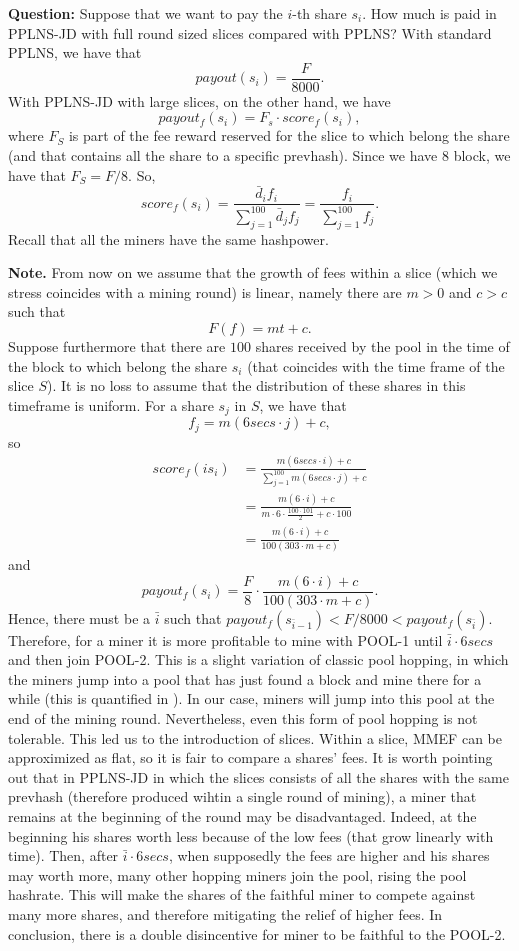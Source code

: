 \documentclass[11pt]{article}
\begin{document}
\textbf{Question:} Suppose that we want to pay the $i$-th share $s_i$. How much is paid in PPLNS-JD with full round sized slices compared with PPLNS?
With standard PPLNS, we have that
\[payout(s_i) = \frac{F}{8000}.\]
With PPLNS-JD with large slices, on the other hand, we have
\[payout_f(s_i) = F_s\cdot score_f(s_i),\]
where $F_S$ is part of the fee reward reserved for the slice to which belong the share (and that contains all the share to a specific prevhash). Since we have $8$ block, we have that $F_S = F/8$. So,
\[score_f(s_i) = \frac{\bar d_i f_i}{\sum_{j=1}^{100} \bar d_j f_j}= \frac{ f_i}{\sum_{j=1}^{100} f_j}. \]
Recall that all the miners have the same hashpower.

\textbf{Note.} From now on we assume that the growth of fees within a slice (which we stress coincides with a mining round) is linear, namely there are $m>0$ and $c>c$ such that
\[F(f) = mt+c.\]
Suppose furthermore that there are $100$ shares received by the pool in the time of the block to which belong the share $s_i$ (that coincides with the time frame of the slice $S$). It is no loss to assume that the distribution of these shares in this timeframe is uniform. For a share $s_j$ in $S$, we have that
\[ f_j = m(6secs \cdot j) +c,\]
so
\begin{align*}
	score_f(is_i) & = \frac{m(6secs\cdot i) +c}{\sum_{j=1}^{100} m(6secs\cdot j) +c}        \\
	              & = \frac{m(6\cdot i) +c}{m\cdot 6\cdot\frac{100\cdot101}{2} +c\cdot 100} \\
	              & = \frac{m(6\cdot i) +c}{100(303\cdot m +c)}
\end{align*}
and
\[payout_f(s_i) = \frac{F}{8} \cdot \frac{m(6\cdot i) +c}{100(303\cdot m +c)}.\]
Hence, there must be a $\bar i$ such that $payout_f(s_{\bar i -1})< F/8000<payout_f(s_{\bar i })$.
Therefore, for a miner it is more profitable to mine with POOL-1 until $\bar i \cdot 6 secs$ and then join POOL-2. This is a slight variation of classic pool hopping, in which the miners jump into a pool that has just found a block and mine there for a while (this is quantified in \cite{rosenfeld}). In our case, miners will jump into this pool at the end of the mining round. Nevertheless, even this form of pool hopping is not tolerable. This led us to the introduction of slices. Within a slice, MMEF can be approximized as flat, so it is fair to compare a shares' fees.
It is worth pointing out that in PPLNS-JD in which the slices consists of all the shares with the same prevhash (therefore produced wihtin a single round of mining), a miner that remains at the beginning of the round may be disadvantaged. Indeed, at the beginning his shares worth less because of the low fees (that grow linearly with time). Then, after $\bar i \cdot 6 secs$, when supposedly the fees are higher and his shares may worth more, many other hopping miners join the pool, rising the pool hashrate. This will make the shares of the faithful miner to compete against many more shares, and therefore mitigating the relief of higher fees. In conclusion, there is a double disincentive for miner to be faithful to the POOL-2.
\end{document}
